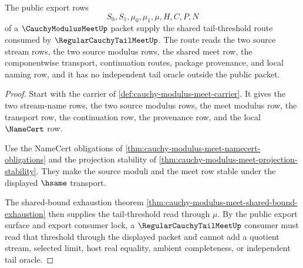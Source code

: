 \begin{theorem}
\label{thm:cauchy-modulus-meet-tail-threshold-compatibility}
The public export rows
$$
S_0,S_1,\mu_0,\mu_1,\mu,H,C,P,N
$$
of a $\CauchyModulusMeetUp$ packet supply the shared tail-threshold route consumed by $\RegularCauchyTailMeetUp$. The route reads the two source stream rows, the two source modulus rows, the shared meet row, the componentwise transport, continuation routes, package provenance, and local naming row, and it has no independent tail oracle outside the public packet.
\end{theorem}
\begin{proof}
Start with the carrier of \autoref{def:cauchy-modulus-meet-carrier}. It gives the two stream-name rows, the two source modulus rows, the meet modulus row, the transport row, the continuation row, the provenance row, and the local $\NameCert$ row.

Use the NameCert obligations of \autoref{thm:cauchy-modulus-meet-namecert-obligations} and the projection stability of \autoref{thm:cauchy-modulus-meet-projection-stability}. They make the source moduli and the meet row stable under the displayed $\hsame$ transport.

The shared-bound exhaustion theorem \autoref{thm:cauchy-modulus-meet-shared-bound-exhaustion} then supplies the tail-threshold read through $\mu$. By the public export surface and export consumer lock, a $\RegularCauchyTailMeetUp$ consumer must read that threshold through the displayed packet and cannot add a quotient stream, selected limit, host real equality, ambient completeness, or independent tail oracle.
\end{proof}

